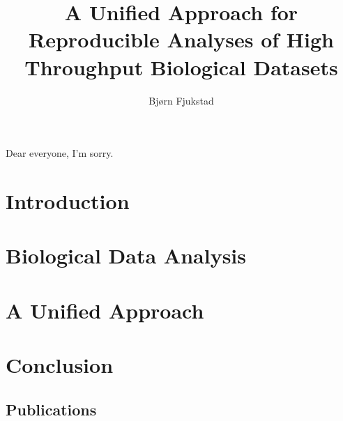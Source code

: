 \documentclass[USenglish,phd]{uit-thesis}
\begin{document}
 

\title{A Unified Approach for Reproducible Analyses of High Throughput
Biological Datasets}
\author{Bjørn Fjukstad}
\maketitle

\begin{dedication}
    Dear everyone, I'm sorry.
\end{dedication}

\frontmatter
 
 

\tableofcontents
\mainmatter

\chapter{Introduction}
 

\chapter{Biological Data Analysis}


\chapter{A Unified Approach}  


\chapter{Conclusion}
 

\appendix
\begin{appendix}
    \chapter{Publications}
\end{appendix}
\end{document}
